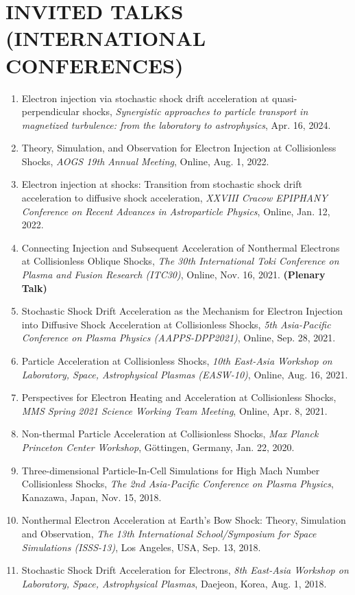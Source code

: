 \documentclass[lualatex,a4paper,ja=standard]{scrartcl}
\newcommand{\NewPart}[2]{\section*{\uppercase{#1} #2}}
\newcommand{\TalkEntry}[3]{
\item #1, \textit{#2}, #3.}
\begin{document}
\newpage
\NewPart{Invited Talks (International Conferences)}{}
\begin{enumerate}

\TalkEntry
{Electron injection via stochastic shock drift acceleration at quasi-perpendicular shocks}
{Synergistic approaches to particle transport in magnetized turbulence: from the laboratory to astrophysics}
{Apr. 16, 2024}

\TalkEntry
{Theory, Simulation, and Observation for Electron Injection at Collisionless Shocks}
{AOGS 19th Annual Meeting}
{Online, Aug. 1, 2022}

\TalkEntry
{Electron injection at shocks: Transition from stochastic shock drift acceleration to diffusive shock acceleration}
{XXVIII Cracow EPIPHANY Conference on Recent Advances in Astroparticle Physics}
{Online, Jan. 12, 2022}

\TalkEntry
{Connecting Injection and Subsequent Acceleration of Nonthermal Electrons at Collisionless Oblique Shocks}
{The 30th International Toki Conference on Plasma and Fusion Research (ITC30)}
{Online, Nov. 16, 2021} \textbf{(Plenary Talk)}

\TalkEntry
{Stochastic Shock Drift Acceleration as the Mechanism for Electron Injection into Diffusive Shock Acceleration at Collisionless Shocks}
{5th Asia-Pacific Conference on Plasma Physics (AAPPS-DPP2021)}
{Online, Sep. 28, 2021}

\TalkEntry
{Particle Acceleration at Collisionless Shocks}
{10th East-Asia Workshop on Laboratory, Space, Astrophysical Plasmas (EASW-10)}
{Online, Aug. 16, 2021}

\TalkEntry
{Perspectives for Electron Heating and Acceleration at Collisionless Shocks}
{MMS Spring 2021 Science Working Team Meeting}
{Online, Apr. 8, 2021}

\TalkEntry
{Non-thermal Particle Acceleration at Collisionless Shocks}
{Max Planck Princeton Center Workshop}
{G\"ottingen, Germany, Jan. 22, 2020}

\TalkEntry
{Three-dimensional Particle-In-Cell Simulations for High Mach Number Collisionless Shocks}
{The 2nd Asia-Pacific Conference on Plasma Physics}
{Kanazawa, Japan, Nov. 15, 2018}

\TalkEntry
{Nonthermal Electron Acceleration at Earth's Bow Shock: Theory, Simulation and Observation}
{The 13th International School/Symposium for Space Simulations (ISSS-13)}
{Los Angeles, USA, Sep. 13, 2018}

\TalkEntry
{Stochastic Shock Drift Acceleration for Electrons}
{8th East-Asia Workshop on Laboratory, Space, Astrophysical Plasmas}
{Daejeon, Korea, Aug. 1, 2018}


\end{enumerate}
\end{document}
